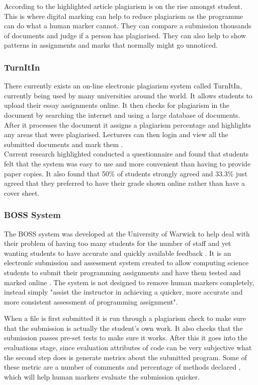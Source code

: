 \documentclass[12pt]{article}  %
\begin{document}
According to the highlighted article \cite{derby_duplication_2008} plagiarism is on the rise amongst student. This is where digital marking can help to reduce plagiarism as the programme can  do what a human marker cannot. They can compare a submission thousands of documents and judge if a person has plagiarised. They can also help to show patterns in assignments and marks that normally might go unnoticed.


\newpage
\subsubsection{TurnItIn}
There currently exists an on-line electronic plagiarism system called TurnItIn, \cite{noauthor_turnitin_nodate} currently being used by many universities around the world. It allows students to upload their essay assignments online. It then checks for plagiarism in the document by searching the internet and using a large database of documents. After it processes the document it assigns a plagiarism percentage and highlights any areas that were plagiarised. Lecturers can then login and view all the submitted documents and mark them .\\
Current research highlighted \cite{dahl_turnitin_2007} conducted a questionnaire and found that students felt that the system was easy to use and more convenient than having to provide paper copies. It also found that 50\% of students strongly agreed and 33.3\% just agreed that they preferred to have their grade shown online rather than have a cover sheet.

\subsubsection{BOSS System}
The BOSS system  was developed at the University of Warwick to help deal with their problem of having too many students for the number of staff and yet wanting students to have accurate and quickly available feedback \cite{joy_boss_2005}.
It is an electronic submission and assessment system created to allow computing science students to submit their programming assignments and have them tested and marked online \cite{joy_effective_1998}. The system is not designed to remove human markers completely, instead simply "assist the instructor in achieving a quicker, more accurate and more consistent assessment of programming assignment"\cite{joy_boss_2005}.

When a file is first submitted it is run through a plagiarism check to make sure that the submission is actually the student’s own work. It also checks that the submission passes pre-set tests to make sure it works. After this it goes into the evaluations stage, since evaluation attributes of code can be very subjective what the second step does is generate metrics about the submitted program. Some of these metric are a number of comments and percentage of methods declared \cite{joy_effective_1998}, which will help human markers evaluate the submission quicker.
\end{document}
